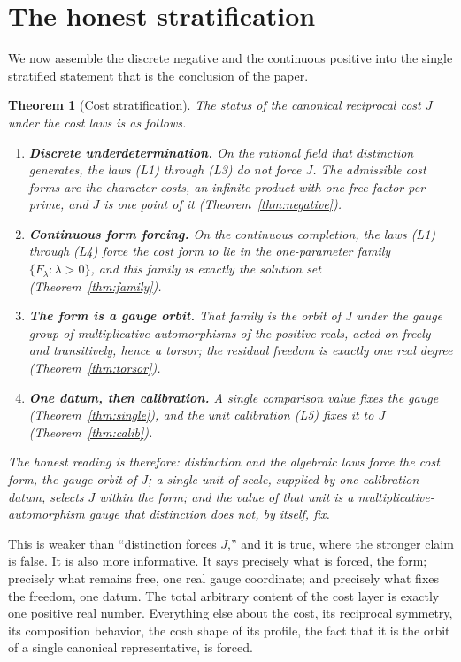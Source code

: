 \documentclass[11pt,a4paper]{article}
\newtheorem{theorem}{Theorem}[section]
\theoremstyle{definition}
\theoremstyle{remark}
\newcommand{\costL}[1]{F_{#1}}
\begin{document}
\section{The honest stratification}\label{sec:stratification}

We now assemble the discrete negative and the continuous positive into the single
stratified statement that is the conclusion of the paper.

\begin{theorem}[Cost stratification]\label{thm:strat}
The status of the canonical reciprocal cost $J$ under the cost laws is as follows.
\begin{enumerate}[leftmargin=2em, label=\textup{(\alph*)}]
  \item \textbf{Discrete underdetermination.} On the rational field that
    distinction generates, the laws (L1) through (L3) do not force $J$. The
    admissible cost forms are the character costs, an infinite product with one
    free factor per prime, and $J$ is one point of it
    \textup{(Theorem~\ref{thm:negative})}.
  \item \textbf{Continuous form forcing.} On the continuous completion, the laws
    (L1) through (L4) force the cost form to lie in the one-parameter family
    $\{\costL{\lambda} : \lambda > 0\}$, and this family is exactly the solution
    set \textup{(Theorem~\ref{thm:family})}.
  \item \textbf{The form is a gauge orbit.} That family is the orbit of $J$ under
    the gauge group of multiplicative automorphisms of the positive reals, acted
    on freely and transitively, hence a torsor; the residual freedom is exactly
    one real degree \textup{(Theorem~\ref{thm:torsor})}.
  \item \textbf{One datum, then calibration.} A single comparison value fixes the
    gauge \textup{(Theorem~\ref{thm:single})}, and the unit calibration (L5)
    fixes it to $J$ \textup{(Theorem~\ref{thm:calib})}.
\end{enumerate}
The honest reading is therefore: distinction and the algebraic laws force the cost
\emph{form}, the gauge orbit of $J$; a single unit of scale, supplied by one
calibration datum, selects $J$ within the form; and the value of that unit is a
multiplicative-automorphism gauge that distinction does not, by itself, fix.
\end{theorem}

This is weaker than ``distinction forces $J$,'' and it is true, where the stronger
claim is false. It is also more informative. It says precisely what is forced, the
form; precisely what remains free, one real gauge coordinate; and precisely what
fixes the freedom, one datum. The total arbitrary content of the cost layer is
exactly one positive real number. Everything else about the cost, its reciprocal
symmetry, its composition behavior, the cosh shape of its profile, the fact that
it is the orbit of a single canonical representative, is forced.
\end{document}
